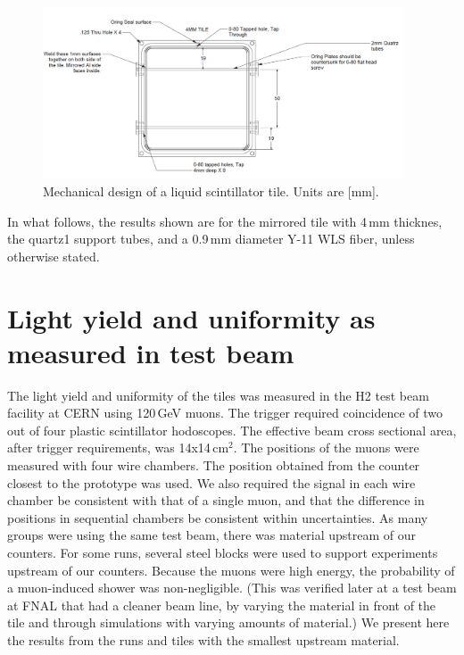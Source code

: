 \documentclass[review]{elsarticle}
\begin{document}
\begin{figure}[!ht]
\begin{center}
\includegraphics[width=0.95\textwidth]{./figures/mechanicaldesign.png}
\caption{Mechanical design of a liquid scintillator tile. Units are
  [mm].}
\label{fig:tiledesign}
\end{center}
\end{figure}

In what follows, the results shown are for the mirrored tile with 4\,mm
thicknes, the quartz1 support tubes, and a 0.9\,mm diameter Y-11 WLS fiber,
unless otherwise stated.

\section{Light yield and uniformity as measured in test beam}

The light yield and uniformity of the tiles was measured in the H2
test beam facility at CERN using 120\,GeV muons. The trigger required
coincidence of two out of four plastic scintillator hodoscopes. The
effective beam cross sectional area, after trigger requirements, was
14x14\,cm$^2$. The positions of the muons were measured with four
wire chambers. The position obtained from the counter closest to the
prototype was used. We also required the signal in each wire chamber
be consistent with that of a single muon, and that the difference in
positions in sequential chambers be consistent within uncertainties.
As many groups were using the same test beam, there was material
upstream of our counters. For some runs, several steel blocks were
used to support experiments upstream of our counters. Because the
muons were high energy, the probability of a muon-induced shower was
non-negligible. (This was verified later at a test beam at FNAL that
had a cleaner beam line, by varying the material in front of the tile
and through simulations with varying amounts of material.) We present here the
results from the runs and tiles with the smallest upstream material.
\end{document}
